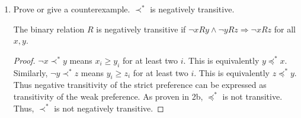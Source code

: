 \documentclass[a4paper, 12pt]{config/homework}
\begin{document}
\begin{enumerate}
\begin{enumerate}[label= (\alph*)]
\begin{enumerate}[label= \roman*.]
\item Prove or give a counterexample. \(\prec^*\) is negatively transitive.

The binary relation \(R\) is negatively transitive if \(\neg xRy \land \neg yRz \Rightarrow \neg xRz\) for all \(x,y\).

\begin{proof}
\(\neg x \prec^* y\) means \(x_i \ge y_i\) for at least two \(i\). This is equivalently \(y \preccurlyeq^* x\).
Similarly, \(\neg y \prec^* z\) means \(y_i \ge z_i\) for at least two \(i\). This is equivalently \(z \preccurlyeq^* y\).
Thus negative transitivity of the strict preference can be expressed as transitivity of the weak preference. As proven in 2b, \(\preccurlyeq^*\) is not transitive. Thus, \(\prec^*\) is not negatively transitive.
\end{proof}

\end{enumerate}
\end{enumerate}
\end{enumerate}
\end{document}
